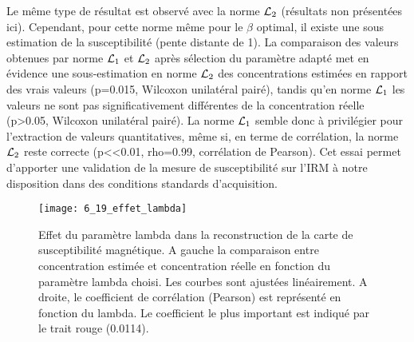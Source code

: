 {Le même type de résultat est observé avec la norme ${\cal L}_2$ (résultats non présentées ici).
Cependant, pour cette norme même pour le $\beta$ optimal, il existe une sous estimation de la susceptibilité
(pente distante de 1). La comparaison des valeurs obtenues par norme ${\cal L}_1$ et ${\cal L}_2$ après sélection du
paramètre adapté met en évidence une sous-estimation en norme ${\cal L}_2$ des concentrations estimées en
rapport des vrais valeurs (p=0.015, Wilcoxon unilatéral pairé), tandis qu’en norme ${\cal L}_1$ les valeurs ne
sont pas significativement différentes de la concentration réelle (p>0.05, Wilcoxon unilatéral pairé). La
norme ${\cal L}_1$ semble donc à privilégier pour l’extraction de valeurs quantitatives, même si, en terme de
corrélation, la norme ${\cal L}_2$ reste correcte (p<<0.01, rho=0.99, corrélation de Pearson). Cet essai permet
d’apporter une validation de la mesure de susceptibilité sur l’IRM à notre disposition dans des
conditions standards d’acquisition.\\

\begin{figure}[!t]
\centering
\texttt{[image: 6\_19\_effet\_lambda]}
\caption{Effet du paramètre lambda dans la reconstruction de la carte de susceptibilité magnétique. A gauche la
comparaison entre concentration estimée et concentration réelle en fonction du paramètre lambda choisi. Les courbes sont
ajustées linéairement. A droite, le coefficient de corrélation (Pearson) est représenté en fonction du lambda. Le coefficient le
plus important est indiqué par le trait rouge (0.0114).}
\label{fig:6_19_effet_lambda}	
\end{figure}


}
